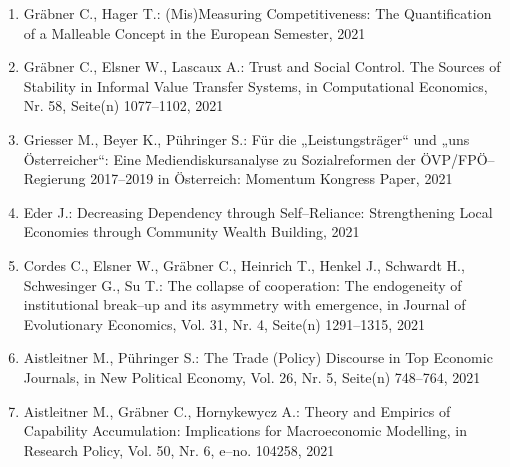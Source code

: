 \begin{enumerate}
	 \item Gräbner C., Hager T.: (Mis)Measuring Competitiveness:  The Quantification of a Malleable Concept in the European Semester, 2021
	 \item Gräbner C., Elsner W., Lascaux A.: Trust and Social Control. The Sources of Stability in Informal Value Transfer Systems, in Computational Economics, Nr. 58, Seite(n) 1077--1102, 2021
	 \item Griesser M., Beyer K., Pühringer S.: Für die „Leistungsträger“ und „uns Österreicher“: Eine Mediendiskursanalyse zu Sozialreformen der ÖVP/FPÖ--Regierung 2017--2019 in Österreich: Momentum Kongress Paper, 2021
	 \item Eder J.: Decreasing Dependency through Self--Reliance: Strengthening Local Economies through Community Wealth Building, 2021
	 \item Cordes C., Elsner W., Gräbner C., Heinrich T., Henkel J., Schwardt H., Schwesinger G., Su T.: The collapse of cooperation: The endogeneity of institutional break--up and its asymmetry with emergence, in Journal of Evolutionary Economics, Vol. 31, Nr. 4, Seite(n) 1291--1315, 2021
	 \item Aistleitner M., Pühringer S.: The Trade (Policy) Discourse in Top Economic Journals, in New Political Economy, Vol. 26, Nr. 5, Seite(n) 748--764, 2021
	 \item Aistleitner M., Gräbner C., Hornykewycz A.: Theory and Empirics of Capability Accumulation: Implications for Macroeconomic Modelling, in Research Policy, Vol. 50, Nr. 6, e--no. 104258, 2021
\end{enumerate}
